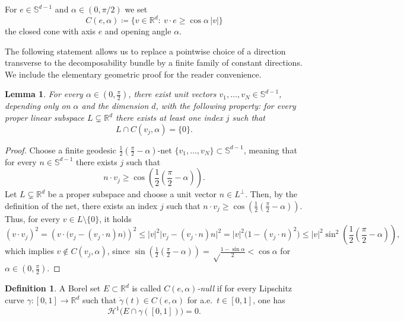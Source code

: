 \documentclass[11pt,a4paper]{article}
\newcommand{\R}{\mathbb{R}}
\newcommand{\HH}{\mathcal{H}}
\newtheorem{lem}[thm]{Lemma}
\theoremstyle{definition}
\newtheorem{defn}[thm]{Definition}
\theoremstyle{remark}
\begin{document}
For $e\in \mathbb{S}^{d-1}$ and $\alpha\in(0,\pi/2)$ we set
$$
C(e,\alpha)\coloneqq \{v\in\R^d:\ v\cdot e\ge \cos\alpha\,|v|\}
$$
the closed cone with axis $e$ and opening angle $\alpha$.

The following statement allows us to replace a pointwise choice of a direction transverse to the decomposability bundle by a finite family of constant directions. We include the elementary geometric proof for the reader convenience.

\begin{lem}\label{lem:finite-directions}
For every $\alpha \in \left(0,\frac{\pi}{2}\right)$, there exist unit vectors $v_1,\dots,v_N\in \mathbb{S}^{d-1}$, depending only on $\alpha$ and the dimension $d$, with the following property:
for every proper linear subspace $L\subsetneq \R^d$ there exists at least one index $j$ such that
$$
L\cap C\left(v_j, \alpha\right)=\{0\}.
$$
\end{lem}

\begin{proof}
Choose a finite geodesic $\frac{1}{2}\left(\frac{\pi}{2}- \alpha\right)$-net $\{v_1,\dots,v_N\}\subset \mathbb{S}^{d-1}$, meaning that for every $n\in \mathbb{S}^{d-1}$ there exists $j$ such that
$$
n \cdot v_j \geq \cos \left( \frac{1}{2} \left(\frac{\pi}{2}- \alpha \right)\right).
$$
Let $L\subsetneq\R^d$ be a proper subspace and choose a unit vector $n\in L^\perp$. Then, by the definition of the net, there exists an index $j$ such that $n\cdot v_j\ge \cos \left( \frac{1}{2} \left(\frac{\pi}{2}- \alpha \right)\right)$. Thus, for every $v \in L \setminus \{0\}$,  it holds
$$
(v \cdot v_j)^2
=
\left( v \cdot \big(v_j - (v_j \cdot n) n\big) \right)^2
\leq
|v|^2\big|v_j - (v_j \cdot n) n\big|^2
=
|v|^2 \big( 1- (v_j \cdot n)^2\big)
\leq
|v|^2 \sin^2\left( \frac{1}{2} \left(\frac{\pi}{2}- \alpha \right)\right),
$$
which implies $v \notin C\left(v_j, \alpha\right)$, since $\sin\left( \frac{1}{2} \left(\frac{\pi}{2}- \alpha \right)\right) = \sqrt\frac{1-\sin \alpha}{2}< \cos \alpha$ for $\alpha \in \left(0,\frac{\pi}{2}\right)$.
\end{proof}

\begin{defn}
A Borel set $E\subset\R^d$ is called \emph{$C(e,\alpha)$-null} if for every Lipschitz curve $\gamma:[0,1]\to\R^d$ such that $\dot\gamma(t)\in C(e,\alpha)$ for a.e.\ $t \in [0,1]$, one has
$$
\HH^1\bigl(E\cap \gamma([0,1])\bigr)=0.
$$
\end{defn}
\end{document}
